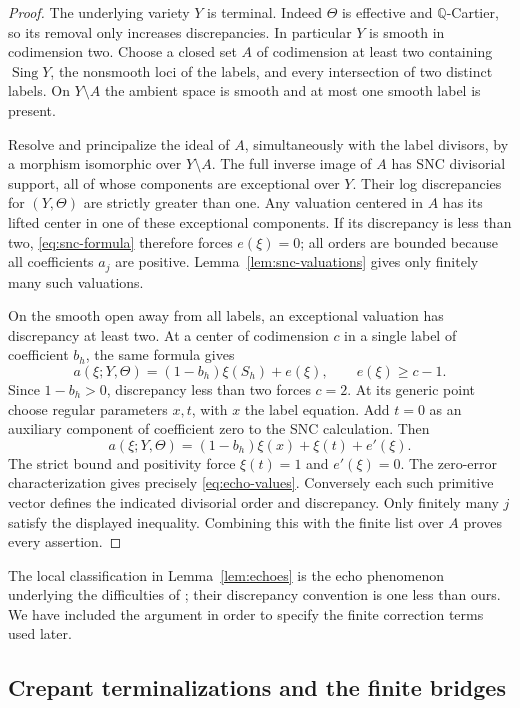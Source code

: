 \begin{proof}
The underlying variety $Y$ is terminal. Indeed $\Theta$ is effective and $\mathbb Q$-Cartier, so its removal only increases discrepancies. In particular $Y$ is smooth in codimension two. Choose a closed set $A$ of codimension at least two containing $\operatorname{Sing}Y$, the nonsmooth loci of the labels, and every intersection of two distinct labels. On $Y\setminus A$ the ambient space is smooth and at most one smooth label is present.

Resolve and principalize the ideal of $A$, simultaneously with the label divisors, by a morphism isomorphic over $Y\setminus A$. The full inverse image of $A$ has SNC divisorial support, all of whose components are exceptional over $Y$. Their log discrepancies for $(Y,\Theta)$ are strictly greater than one. Any valuation centered in $A$ has its lifted center in one of these exceptional components. If its discrepancy is less than two, \eqref{eq:snc-formula} therefore forces $e(\xi)=0$; all orders are bounded because all coefficients $a_j$ are positive. Lemma~\ref{lem:snc-valuations} gives only finitely many such valuations.

On the smooth open away from all labels, an exceptional valuation has discrepancy at least two. At a center of codimension $c$ in a single label of coefficient $b_h$, the same formula gives
\[
 a(\xi;Y,\Theta)=(1-b_h)\xi(S_h)+e(\xi),
 \qquad e(\xi)\geq c-1.
\]
Since $1-b_h>0$, discrepancy less than two forces $c=2$. At its generic point choose regular parameters $x,t$, with $x$ the label equation. Add $t=0$ as an auxiliary component of coefficient zero to the SNC calculation. Then
\[
 a(\xi;Y,\Theta)=(1-b_h)\xi(x)+\xi(t)+e'(\xi).
\]
The strict bound and positivity force $\xi(t)=1$ and $e'(\xi)=0$. The zero-error characterization gives precisely \eqref{eq:echo-values}. Conversely each such primitive vector defines the indicated divisorial order and discrepancy. Only finitely many $j$ satisfy the displayed inequality. Combining this with the finite list over $A$ proves every assertion.
\end{proof}

The local classification in Lemma~\ref{lem:echoes} is the echo phenomenon underlying the difficulties of \cite[Example~1.4 and Lemma~1.5]{AHK}; their discrepancy convention is one less than ours. We have included the argument in order to specify the finite correction terms used later.

\subsection{Crepant terminalizations and the finite bridges}

